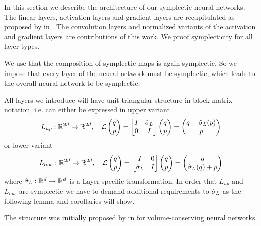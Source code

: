 \documentclass[twoside,a4paper]{article}
\begin{document}
In this section we describe the architecture of our symplectic neural networks.
The linear layers, activation layers and gradient layers are recapitulated as 
proposed by \citeauthor{Jin2020} in \cite{Jin2020}.
The convolution layers and normalized variants of the activation and gradient layers
are contributions of this work. 
We proof symplecticity for all layer types. 

We use that the composition of symplectic maps is again symplectic. So we impose that every
layer of the neural network must be symplectic, which leads to the overall neural network
to be symplectic.

All layers we introduce will have unit triangular structure in block matrix notation, 
i.e. can either be expressed in upper variant
\begin{equation*}
	L_{up} : \mathbb{R}^{2d} \to \mathbb{R}^{2d},
	\quad \mathcal{L} \begin{pmatrix} q \\ p \end{pmatrix} = \begin{bmatrix} I & {\hat{\sigma}_L} \\ 0 & I \end{bmatrix} \begin{pmatrix} q \\ p \end{pmatrix}
	= \begin{pmatrix}
		q + \hat{\sigma}_L(p) \\
		p
	\end{pmatrix}
\end{equation*}
or lower variant
\begin{equation*}
	L_{low} : \mathbb{R}^{2d} \to \mathbb{R}^{2d},
	\quad \mathcal{L} \begin{pmatrix} q \\ p \end{pmatrix} = \begin{bmatrix} I & 0 \\ {\hat{\sigma}_L} & I \end{bmatrix} \begin{pmatrix} q \\ p \end{pmatrix}
	= \begin{pmatrix}
		q \\
		\hat{\sigma}_L(q) + p
	\end{pmatrix}
\end{equation*}
where $\hat{\sigma}_L : \mathbb{R}^d \to \mathbb{R}^d$ is a Layer-specific transformation.
In order that $L_{up}$ and $L_{low}$ are symplectic we have to demand additional requirements
to $\hat{\sigma}_L$ as the following lemma and corollaries will show.

The structure was initially proposed by \citeauthor{Deco1995} in \cite{Deco1995} 
 for volume-conserving neural networks.

\end{document}
